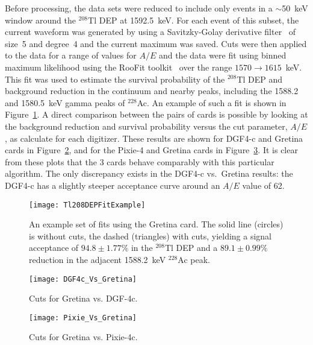 	 Before processing, the data sets were reduced to include only events in a $\sim$50~keV window around the $^{208}$Tl DEP at 1592.5~keV.  For each event of this subset, the current waveform was generated by using a Savitzky-Golay derivative filter~\cite{Sav64aa} of size~5 and degree~4 and the current maximum was saved.  Cuts were then applied to the data for a range of values for $A/E$ and the data were fit using binned maximum likelihood using the RooFit toolkit~\cite{ver03aa} over the range $1570\to1615$~keV.  This fit was used to estimate the survival probability of the $^{208}$Tl DEP and background reduction in the continuum and nearby peaks, including the 1588.2 and 1580.5~keV gamma peaks of $^{228}$Ac.  An example of such a fit is shown in Figure~\ref{fig:HeadToHeadExampleFit}.  A direct comparison between the pairs of cards is possible by looking at the background reduction and survival probability versus the cut parameter, $A/E$, as calculate for each digitizer.  These results are shown for DGF4-c and Gretina cards in Figure~\ref{fig:HeadToHeadDGF4cResults}, and for the Pixie-4 and Gretina cards in Figure~\ref{fig:HeadToHeadPixie4cResults}.  It is clear from these plots that the 3 cards behave comparably with this particular algorithm.  The only discrepancy exists in the DGF4-c vs.~Gretina results: the DGF4-c has a slightly steeper acceptance curve around an $A/E$ value of 62.
	 
			\begin{figure}
				\centering
				\texttt{[image: Tl208DEPFitExample]}
				\caption[An example set of fits using the Gretina card]
				{An example set of fits using the Gretina card.  The solid line (circles) is without cuts, the dashed (triangles)
				 with cuts, yielding a signal acceptance of $94.8\pm1.77\%$ in the $^{208}$Tl DEP and a $89.1\pm0.99\%$ 
				 reduction in the adjacent 1588.2~keV $^{228}$Ac peak.}
				\label{fig:HeadToHeadExampleFit}
			\end{figure}	
		
			\begin{figure}
				\centering
				\texttt{[image: DGF4c\_Vs\_Gretina]}
				\caption[Cuts for Gretina vs. DGF-4c]
				{Cuts for Gretina vs. DGF-4c.}
				\label{fig:HeadToHeadDGF4cResults}
			\end{figure}	
	
			\begin{figure}
				\centeringdesptie
				\texttt{[image: Pixie\_Vs\_Gretina]}
				\caption[Cuts for Gretina vs. Pixie-4c]{Cuts for Gretina vs. Pixie-4c.}
				\label{fig:HeadToHeadPixie4cResults}
			\end{figure}	
			

